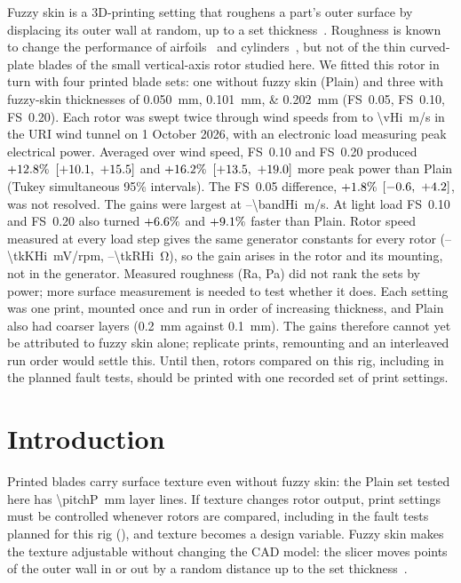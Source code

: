 \documentclass[11pt]{article}
\begin{document}
Fuzzy skin is a 3D-printing setting that roughens a part's outer surface by displacing its outer
wall at random, up to a set thickness~\cite{prusa}. Roughness is known to change the performance
of airfoils~\cite{wilcox} and cylinders~\cite{achenbach}, but not of the thin curved-plate blades
of the small vertical-axis rotor studied here. We fitted this rotor in turn with four printed blade
sets: one without fuzzy skin (Plain) and three with fuzzy-skin thicknesses of
\SIlist{0.050;0.101;0.202}{mm} (FS~0.05, FS~0.10, FS~0.20). Each rotor was swept twice through
\nSP{} wind speeds from \vLo{} to \SI{\vHi}{m/s} in the URI wind tunnel on 1 October 2026, with an
electronic load measuring peak electrical power. Averaged over wind speed, FS~0.10 and FS~0.20
produced $+12.8\%$ $[+10.1,\ +15.5]$ and $+16.2\%$ $[+13.5,\ +19.0]$ more peak power than Plain
(Tukey simultaneous 95\% intervals). The FS~0.05 difference, $+1.8\%$ $[-0.6,\ +4.2]$, was not
resolved. The gains were largest at \bandLo--\SI{\bandHi}{m/s}. At light load FS~0.10 and FS~0.20
also turned $+6.6\%$ and $+9.1\%$ faster than Plain. Rotor speed measured at every load step
gives the same generator constants for every rotor (\tkKLo--\SI{\tkKHi}{mV/rpm},
\tkRLo--\SI{\tkRHi}{\ohm}), so the gain arises in the rotor and its mounting, not in the
generator. Measured roughness (Ra, Pa) did not rank the sets by power; more surface measurement is
needed to test whether it does. Each setting was one print, mounted once and run in order of
increasing thickness, and Plain also had coarser layers (\SI{0.2}{mm} against \SI{0.1}{mm}). The
gains therefore cannot yet be attributed to fuzzy skin alone; replicate prints, remounting and an
interleaved run order would settle this. Until then, rotors compared on this rig, including in the
planned fault tests, should be printed with one recorded set of print settings.

\section{Introduction}\label{sec:scope}

Printed blades carry surface texture even without fuzzy skin: the Plain set tested here has
\SI{\pitchP}{mm} layer lines. If texture changes rotor output, print settings must be controlled
whenever rotors are compared, including in the fault tests planned for this rig
(), and texture becomes a design variable. Fuzzy skin makes the texture
adjustable without changing the CAD model: the slicer moves points of the outer wall in or out by a
random distance up to the set thickness~\cite{prusa}.
\end{document}
